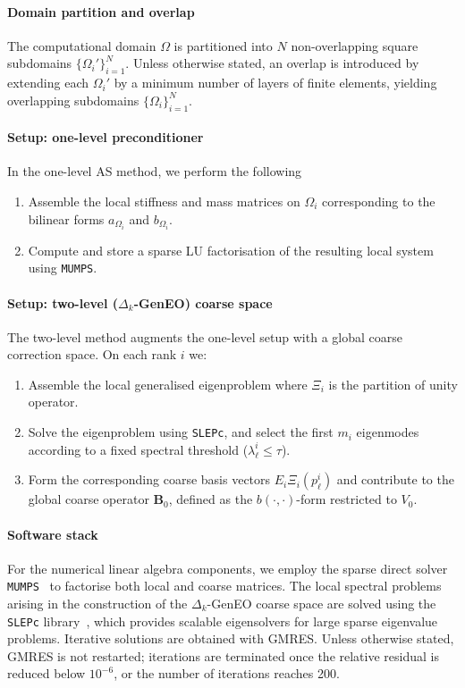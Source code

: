 \documentclass[preprint,3p,times]{elsarticle}
\theoremstyle{definition}
\numberwithin{equation}{section}
\begin{document}
\paragraph{Domain partition and overlap}
The computational domain $\Omega$ is partitioned into $N$ non-overlapping square subdomains $\{\Omega_i'\}_{i=1}^N$.
Unless otherwise stated, an overlap is introduced by extending each $\Omega_i'$ 
by a minimum number of layers of finite elements, yielding overlapping subdomains $\{\Omega_i\}_{i=1}^N$.  

\paragraph{Setup: one-level preconditioner}
In the one-level AS method, we perform the following
\begin{enumerate}
  \item Assemble the local stiffness and mass matrices on $\Omega_i$ corresponding to the bilinear forms $a_{\Omega_i}$ and $b_{\Omega_i}$.
  \item Compute and store a sparse LU factorisation of the resulting local system using \texttt{MUMPS}.
\end{enumerate}

\paragraph{Setup: two-level ($\Delta_k$-GenEO) coarse space}
The two-level method augments the one-level setup with a global coarse correction space. On each rank $i$ we:
\begin{enumerate}
  \item 
  Assemble the local generalised eigenproblem
  where $\Xi_i$ is the partition of unity operator.
  \item 
  Solve the eigenproblem using \texttt{SLEPc}, and select the first $m_i$ eigenmodes according to a fixed 
  spectral threshold ($\lambda_\ell^i \leq \tau$). 
  \item 
  Form the corresponding coarse basis vectors $E_i \Xi_i(p_\ell^i)$ and contribute to the global coarse operator $\mathbf{B}_0$, 
  defined as the $b(\cdot,\cdot)$-form restricted to $V_0$.
\end{enumerate}


\paragraph{Software stack}
For the numerical linear algebra components, we employ the sparse direct solver \texttt{MUMPS}~\cite{amestoy2001fully} 
to factorise both local and coarse matrices. The local spectral problems arising in the construction 
of the $\Delta_k$-GenEO coarse space are solved using the \texttt{SLEPc} library~\cite{hernandez2005ssf}, 
which provides scalable eigensolvers for large sparse eigenvalue problems. Iterative solutions are obtained with GMRES. 
Unless otherwise stated, GMRES is not restarted; iterations are terminated once the relative residual 
is reduced below $10^{-6}$, or the number of iterations reaches 200.
\end{document}
